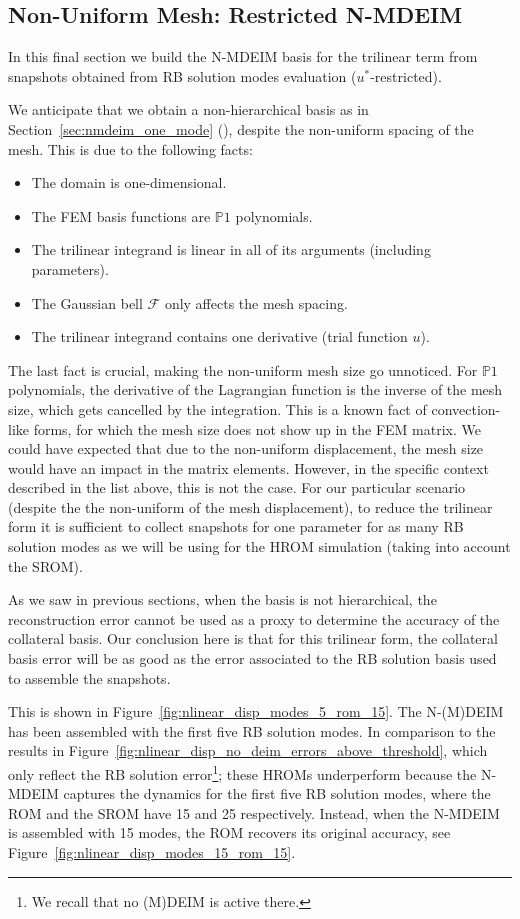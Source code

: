 \documentclass[../../thesis.tex]{subfiles}
\begin{document}
\clearpage
\subsection{Non-Uniform Mesh: Restricted N-MDEIM}
\label{sec:arbitrary_mesh_nmdeim_mode_evaluation}
In this final section we build the N-MDEIM basis for the trilinear term
from snapshots obtained from RB solution modes evaluation 
($u^{*}$-restricted).

We anticipate that we obtain a non-hierarchical basis as in
Section~\ref{sec:nmdeim_one_mode} 
(), 
despite the non-uniform spacing of the mesh.
This is due to the following facts:
\begin{itemize}
    \item The domain is one-dimensional.
    \item The FEM basis functions are $\mathbb{P}1$ polynomials.
    \item The trilinear integrand is linear in all of its arguments (including parameters).
    \item The Gaussian bell $\mathcal{F}$ only affects the mesh spacing.
    \item The trilinear integrand contains one derivative (trial function $u$).
\end{itemize}
The last fact is crucial, making the non-uniform mesh size go unnoticed.
For $\mathbb{P}1$ polynomials, the derivative of the Lagrangian function 
is the inverse of the mesh size, which gets cancelled by the integration.
This is a known fact of convection-like forms, 
for which the mesh size does not show up in the FEM matrix.
We could have expected that due to the non-uniform displacement,
the mesh size would have an impact in the matrix elements.
However, in the specific context described in the list above,
this is not the case.
For our particular scenario 
(despite the the non-uniform of the mesh displacement),
to reduce the trilinear form it is sufficient to collect snapshots for one parameter
for as many RB solution modes as we will be using for the HROM simulation
(taking into account the SROM). 

As we saw in previous sections, when the basis is not hierarchical, 
the reconstruction error cannot be used as a proxy to determine the accuracy of the collateral basis.
Our conclusion here is that for this trilinear form, 
the collateral basis error will be as good as the error associated 
to the RB solution basis used to assemble the snapshots.

This is shown in Figure~\ref{fig:nlinear_disp_modes_5_rom_15}.
The \mbox{N-(M)DEIM} has been assembled with the first five RB solution modes.
In comparison to the results in Figure~\ref{fig:nlinear_disp_no_deim_errors_above_threshold},
which only reflect the RB solution error\footnote
{
    We recall that no (M)DEIM is active there.
};
these HROMs underperform because the \mbox{N-MDEIM} captures the dynamics for the first five RB solution modes,
where the ROM and the SROM have 15 and 25 respectively.
Instead, when the \mbox{N-MDEIM} is assembled with 15 modes, the ROM recovers its original accuracy,
see Figure~\ref{fig:nlinear_disp_modes_15_rom_15}.
\end{document}
